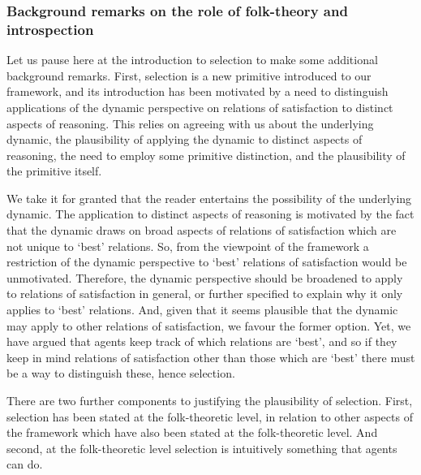\documentclass[10pt]{article}
\makeatletter
\renewcommand\paragraph{\@startsection{paragraph}{5}{\z@}%
  {3.25ex \@plus1ex \@minus.2ex}%
  {-1em}%
  {\normalfont\normalsize\bfseries}}
\makeatother
\begin{document}
\subsubsection{Background remarks on the role of folk-theory and introspection}
\label{sec:backgr-remarks-role}

Let us pause here at the introduction to selection to make some additional background remarks.
First, selection is a new primitive introduced to our framework, and its introduction has been motivated by a need to distinguish applications of the dynamic perspective on relations of satisfaction to distinct aspects of reasoning.
This relies on agreeing with us about the underlying dynamic, the plausibility of applying the dynamic to distinct aspects of reasoning, the need to employ some primitive distinction, and the plausibility of the primitive itself.

We take it for granted that the reader entertains the possibility of the underlying dynamic.
The application to distinct aspects of reasoning is motivated by the fact that the dynamic draws on broad aspects of relations of satisfaction which are not unique to `best' relations.
So, from the viewpoint of the framework a restriction of the dynamic perspective to `best' relations of satisfaction would be unmotivated.
Therefore, the dynamic perspective should be broadened to apply to relations of satisfaction in general, or further specified to explain why it only applies to `best' relations.
And, given that it seems plausible that the dynamic may apply to other relations of satisfaction, we favour the former option.
Yet, we have argued that agents keep track of which relations are `best', and so if they keep in mind relations of satisfaction other than those which are `best' there must be a way to distinguish these, hence selection.

There are two further components to justifying the plausibility of selection.
First, selection has been stated at the folk-theoretic level, in relation to other aspects of the framework which have also been stated at the folk-theoretic level.
And second, at the folk-theoretic level selection is intuitively something that agents can do.
\end{document}
